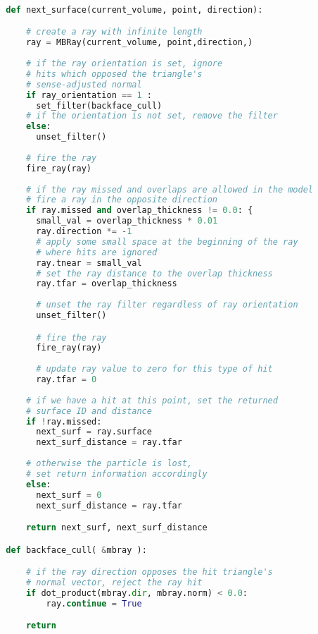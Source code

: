 \begin{lstlisting}[language=Python,basicstyle=\tiny,caption={Algorithm used in \textit{Next Surface} queries.},captionpos=b,label={alg:Next Surface Pseudo Code}]
  
  def next_surface(current_volume, point, direction):

      # create a ray with infinite length
      ray = MBRay(current_volume, point,direction,)
    
      # if the ray orientation is set, ignore
      # hits which opposed the triangle's
      # sense-adjusted normal
      if ray_orientation == 1 :
        set_filter(backface_cull)
      # if the orientation is not set, remove the filter
      else:
        unset_filter()
    
      # fire the ray
      fire_ray(ray)
    
      # if the ray missed and overlaps are allowed in the model
      # fire a ray in the opposite direction
      if ray.missed and overlap_thickness != 0.0: {
        small_val = overlap_thickness * 0.01
        ray.direction *= -1
        # apply some small space at the beginning of the ray
        # where hits are ignored
        ray.tnear = small_val
        # set the ray distance to the overlap thickness
        ray.tfar = overlap_thickness
    
        # unset the ray filter regardless of ray orientation
        unset_filter()

        # fire the ray
        fire_ray(ray)
        
        # update ray value to zero for this type of hit
        ray.tfar = 0
    
      # if we have a hit at this point, set the returned
      # surface ID and distance
      if !ray.missed:
        next_surf = ray.surface
        next_surf_distance = ray.tfar
        
      # otherwise the particle is lost,
      # set return information accordingly
      else:
        next_surf = 0
        next_surf_distance = ray.tfar

      return next_surf, next_surf_distance

  def backface_cull( &mbray ):

      # if the ray direction opposes the hit triangle's
      # normal vector, reject the ray hit
      if dot_product(mbray.dir, mbray.norm) < 0.0:
          ray.continue = True

      return

\end{lstlisting}

